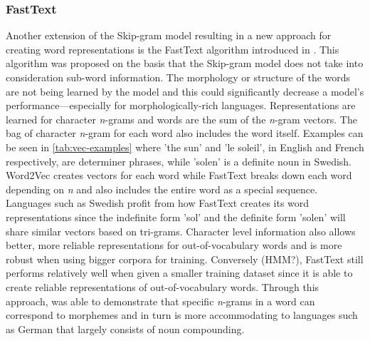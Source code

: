 \subsubsection{FastText}
Another extension of the Skip-gram model resulting in a new approach for creating word representations is the FastText algorithm introduced in \citet{bojanowski2017enriching}. This algorithm was proposed on the basis that the Skip-gram model does not take into consideration sub-word information. The morphology or structure of the words are not being learned by the model and this could significantly decrease a model’s performance—especially for morphologically-rich languages. Representations are learned for character \emph{n}-grams and words are the sum of the \emph{n}-gram vectors. The bag of character \emph{n}-gram for each word also includes the word itself. Examples can be seen in \autoref{tab:vec-examples} where 'the sun' and 'le soleil', in English and French respectively, are determiner phrases,  while 'solen' is a definite noun in Swedish. Word2Vec creates vectors for each word while FastText breaks down each word depending on \emph{n} and also includes the entire word as a special sequence. Languages such as Swedish profit from how FastText creates its word representations since the indefinite form 'sol' and the definite form 'solen' will share similar vectors based on tri-grams. Character level information also allows better, more reliable representations for out-of-vocabulary words and is more robust when using bigger corpora for training. Conversely (HMM?), FastText still performs relatively well when given a smaller training dataset since it is able to create reliable representations of out-of-vocabulary words. Through this approach, \citet{bojanowski2017enriching} was able to demonstrate that specific \emph{n}-grams in a word can correspond to morphemes and in turn is more accommodating to languages such as German that largely consists of noun compounding.



